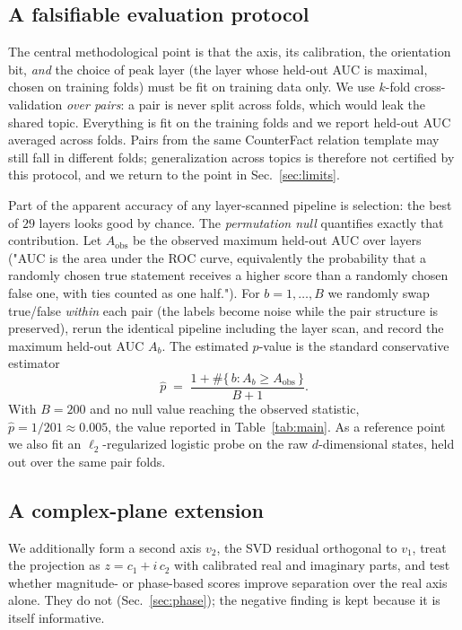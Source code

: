 \documentclass[11pt]{article}
\begin{document}
\subsection{A falsifiable evaluation protocol}
\label{sec:protocol}

The central methodological point is that the axis, its calibration, the
orientation bit, \emph{and} the choice of peak layer (the layer whose held-out AUC is maximal, chosen on training folds) must be fit on training
data only. We use $k$-fold cross-validation \emph{over pairs}: a pair is
never split across folds, which would leak the shared topic. Everything is
fit on the training folds and we report held-out AUC averaged across folds.
Pairs from the same CounterFact relation template may still fall in
different folds; generalization across topics is therefore not certified by
this protocol, and we return to the point in Sec.~\ref{sec:limits}.

Part of the apparent accuracy of any layer-scanned pipeline is selection: the
best of $29$ layers looks good by chance. The \emph{permutation null}
quantifies exactly that contribution. Let $A_{\mathrm{obs}}$ be the observed
maximum held-out AUC over layers ("AUC is the area under the ROC curve, equivalently the probability that a randomly chosen true statement receives a higher score than a randomly chosen false one, with ties counted as one half."). For $b = 1, \dots, B$ we randomly swap
true/false \emph{within} each pair (the labels become noise while the pair
structure is preserved), rerun the identical pipeline including the layer
scan, and record the maximum held-out AUC $A_b$. The estimated $p$-value is
the standard conservative estimator
\begin{equation}
\hat{p} \;=\; \frac{1 + \#\{\,b : A_b \ge A_{\mathrm{obs}}\,\}}{B + 1}.
\end{equation}
With $B = 200$ and no null value reaching the observed statistic,
$\hat{p} = 1/201 \approx 0.005$, the value reported in
Table~\ref{tab:main}. As a reference point we also fit an
$\ell_2$-regularized logistic probe on the raw $d$-dimensional states, held
out over the same pair folds.

\subsection{A complex-plane extension}
\label{sec:complexmethod}

We additionally form a second axis $v_2$, the SVD residual orthogonal to
$v_1$, treat the projection as $z = c_1 + i\,c_2$ with calibrated real and
imaginary parts, and test whether magnitude- or phase-based scores improve
separation over the real axis alone. They do not (Sec.~\ref{sec:phase}); the
negative finding is kept because it is itself informative.
\end{document}
